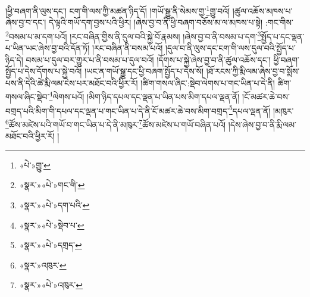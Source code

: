 །ཕྱི་བཞག་ནི་ལུས་དང་། ངག་གི་ལས་ཀྱི་མཚན་ཉིད་དོ། །གཡོ་སྒྱུ་ནི་སེམས་གྱ་\footnote{«པེ་»གྱུ་}གྱུ་བའོ། །ཚུལ་འཆོས་མཁས་པ་ཞེས་བྱ་བ་དང་། དེ་ལྟའི་གཡོ་དག་བྱས་པའི་ཕྱིར། །ཞེས་བྱ་བ་ནི་ཕྱི་བཞག་བཅོས་མ་ལ་མཁས་པ་སྟེ། :གང་གིས་\footnote{«སྣར་»«པེ་»གང་གི་}བསམ་པ་མ་དག་པའོ། །རང་བཞིན་གྱིས་ནི་དུལ་བའི་སྐྱེ་བོ་རྣམས། །ཞེས་བྱ་བ་ནི་བསམ་པ་དག་\footnote{«སྣར་»«པེ་»དག་པའི་}སྤྱོད་པ་དང་ལྡན་པ་ཡིན་ཡང་ཞེས་བྱ་བའི་དོན་ཏོ། །རང་བཞིན་ནི་བསམ་པའོ། །དུལ་བ་ནི་ལུས་དང་ངག་གི་ལས་དུལ་བའི་སྤྱོད་པ་ཉིད་དེ། བསམ་པ་དུལ་བར་གྱུར་པ་ནི་བསམ་པ་དུལ་བའོ། །དོགས་པ་སྐྱེ་ཞེས་བྱ་བ་ནི་ཚུལ་འཆོས་དང་། ཕྱི་བཞག་སྤྱོད་པ་དེས་དོགས་པ་སྐྱེ་བའོ། །ཡང་ན་གཡོ་སྒྱུ་དང་ཕྱི་བཞག་སྤྱོད་པ་དེས་སོ། །ཐོ་རངས་ཀྱི་རྨི་ལམ་ཞེས་བྱ་བ་སྨོས་པས་ནི་དེའི་ཚེ་རྨི་ལམ་ངེས་པར་མཐོང་བའི་ཕྱིར་རོ། །ཚིག་གསལ་ཞིང་:སྡེབ་ལེགས་པ་གང་ཡིན་པ་དེ་ནི། ཚིག་གསལ་ཞིང་སྡེབ་\footnote{«སྣར་»«པེ་»སྡེབ་པ་}ལེགས་པའོ། །མིག་ཉིད་དཔལ་དང་ལྡན་པ་ཡིན་པས་མིག་དཔལ་ལྡན་ནོ། །ངོ་མཚར་ཆེ་བས་བགྲད་པའི་མིག་གི་དཔལ་དང་ལྡན་པ་གང་ཡིན་པ་དེ་ནི་ངོ་མཚར་ཆེ་བས་མིག་བགྲད་\footnote{«སྣར་»«པེ་»དགྲད་}དཔལ་ལྡན་ནོ། །མཁུར་\footnote{«སྣར་»འཁུར་}ཚོས་མཛེས་པའི་གཡོ་བ་གང་ཡིན་པ་དེ་ནི་མཁུར་\footnote{«སྣར་»«པེ་»འཁུར་}ཚོས་མཛེས་པ་གཡོ་བཞིན་པའོ། །དེས་ཞེས་བྱ་བ་ནི་རྨི་ལམ་མཐོང་བའི་ཕྱིར་རོ། །
